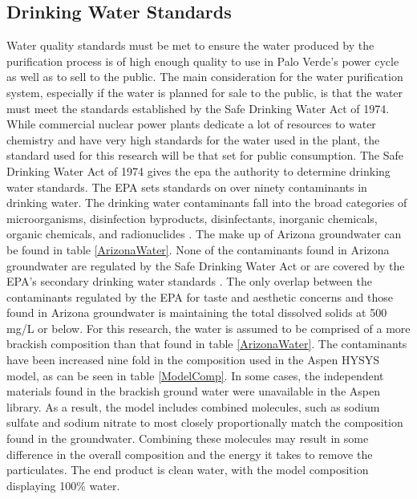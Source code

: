 \subsection{Drinking Water Standards}
Water quality standards must be met to ensure the water produced by the purification process is of high enough quality to use in Palo Verde's power cycle as well as to sell to the public. The main consideration for the water purification system, especially if the water is planned for sale to the public, is that the water must meet the standards established by the Safe Drinking Water Act of 1974. While commercial nuclear power plants dedicate a lot of resources to water chemistry and have very high standards for the water used in the plant, the standard used for this research will be that set for public consumption. The Safe Drinking Water Act of 1974 gives the \ac{epa} the authority to determine drinking water standards. The EPA sets standards on over ninety contaminants in drinking water. The drinking water contaminants fall into the broad categories of microorganisms, disinfection byproducts, disinfectants, inorganic chemicals, organic chemicals, and radionuclides \cite{USEPA}. The make up of Arizona groundwater can be found in table \ref{ArizonaWater}.  None of the contaminants found in Arizona groundwater are regulated by the Safe Drinking Water Act or are covered by the EPA's secondary drinking water standards \cite{USEPA}. The only overlap between the contaminants regulated by the EPA for taste and aesthetic concerns and those found in Arizona groundwater is maintaining the total dissolved solids at 500 mg/L or below. For this research, the water is assumed to be comprised of a more brackish composition than that found in table \ref{ArizonaWater}. The contaminants have been increased nine fold in the composition used in the Aspen HYSYS model, as can be seen in table \ref{ModelComp}.  In some cases, the independent materials found in the brackish ground water were unavailable in the Aspen library.  As a result, the model includes combined molecules, such as sodium sulfate and sodium nitrate to most closely proportionally match the composition found in the groundwater.  Combining these molecules may result in some difference in the overall composition and the energy it takes to remove the particulates. The end product is clean water, with the model composition displaying 100\% water.

